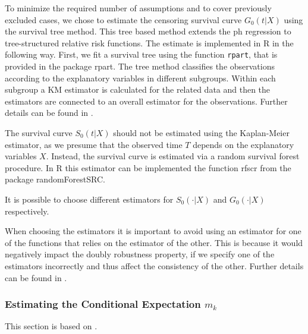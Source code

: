 \documentclass[12pt, a4paper]{article}
\theoremstyle{definition}
\theoremstyle{plain}
\numberwithin{equation}{section}
\numberwithin{figure}{section}
\numberwithin{table}{section}
\begin{document}
	To minimize the required number of assumptions and to cover previously excluded cases, we chose to estimate the censoring survival curve $G_0(t \vert X)$ using the survival tree method.
	This tree based method extends the ph regression to tree-structured relative risk functions.
	The estimate is implemented in R in the following way.
	First, we fit a survival tree using the function \texttt{rpart}, that is provided in the package rpart.
	The tree method classifies the observations according to the explanatory variables in different subgroups.
	Within each subgroup a KM estimator is calculated for the related data and then the estimators are connected to an overall estimator for the observations. %
	Further details can be found in \citet*{relativerisktrees}.
	
	The survival curve $S_0(t\vert X)$ should not be estimated using the Kaplan-Meier estimator, as we presume that the observed time $T$ depends on the explanatory variables $X$.
	Instead, the survival curve is estimated via a random survival forest procedure.
	In R this estimator can be implemented the function rfscr from the package randomForestSRC. 
	
	It is possible to choose different estimators for $S_0(\cdot\vert X)$ and $G_0(\cdot\vert X)$ respectively.
	
	When choosing the estimators it is important to avoid using an estimator for one of the functions that relies on the estimator of the other.
	This is because it would negatively impact the doubly robustness property, if we specify one of the estimators incorrectly and thus affect the consistency of the other.
	Further details can be found in \citet*{drtrees}.
	
	\subsubsection{Estimating the Conditional Expectation $m_k$}
	
	This section is based on \citet*{drtrees}.
	
\end{document}
